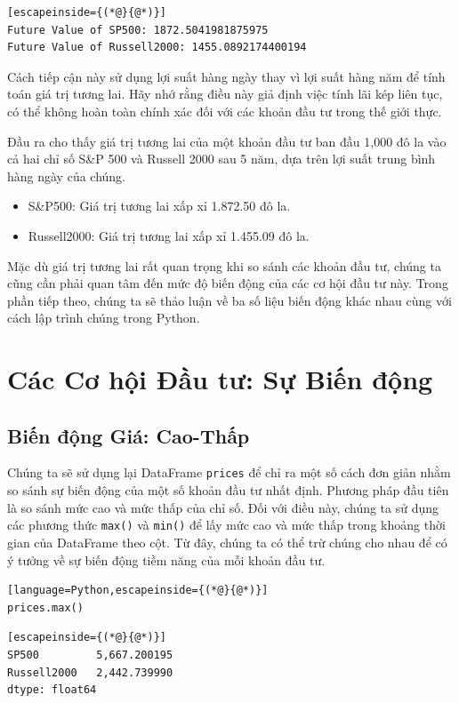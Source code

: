 \begin{lstlisting}[escapeinside={(*@}{@*)}]
Future Value of SP500: 1872.5041981875975
Future Value of Russell2000: 1455.0892174400194
\end{lstlisting}

Cách tiếp cận này sử dụng lợi suất hàng ngày thay vì lợi suất hàng năm để tính toán giá trị tương lai. Hãy nhớ rằng điều này giả định việc tính lãi kép liên tục, có thể không hoàn toàn chính xác đối với các khoản đầu tư trong thế giới thực.

Đầu ra cho thấy giá trị tương lai của một khoản đầu tư ban đầu 1,000 đô la vào cả hai chỉ số S\&P 500 và Russell 2000 sau 5 năm, dựa trên lợi suất trung bình hàng ngày của chúng.

\begin{itemize}
  \item S\&P500: Giá trị tương lai xấp xỉ 1.872.50 đô la.
  \item Russell2000: Giá trị tương lai xấp xỉ 1.455.09 đô la.
\end{itemize}
Mặc dù giá trị tương lai rất quan trọng khi so sánh các khoản đầu tư, chúng ta cũng cần phải quan tâm đến mức độ biến động của các cơ hội đầu tư này. Trong phần tiếp theo, chúng ta sẽ thảo luận về ba số liệu biến động khác nhau cùng với cách lập trình chúng trong Python.

\section{Các Cơ hội Đầu tư: Sự Biến động}

\subsection{Biến động Giá: Cao-Thấp}

Chúng ta sẽ sử dụng lại DataFrame \texttt{prices} để chỉ ra một số cách đơn giản nhằm so sánh sự biến động của một số khoản đầu tư nhất định. Phương pháp đầu tiên là so sánh mức cao và mức thấp của chỉ số. Đối với điều này, chúng ta sử dụng các phương thức \texttt{max()} và \texttt{min()} để lấy mức cao và mức thấp trong khoảng thời gian của DataFrame theo cột. Từ đây, chúng ta có thể trừ chúng cho nhau để có ý tưởng về sự biến động tiềm năng của mỗi khoản đầu tư.

\begin{lstlisting}[language=Python,escapeinside={(*@}{@*)}]
prices.max()
\end{lstlisting}

\begin{lstlisting}[escapeinside={(*@}{@*)}]
SP500         5,667.200195
Russell2000   2,442.739990
dtype: float64
\end{lstlisting}

